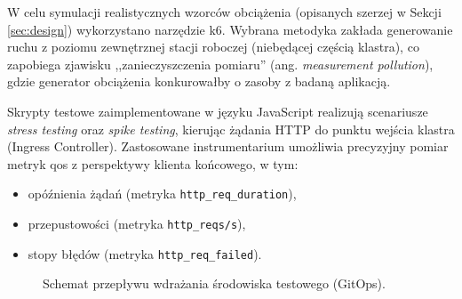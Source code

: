 W celu symulacji realistycznych wzorców obciążenia (opisanych szerzej w Sekcji \ref{sec:design}) wykorzystano narzędzie 
\gls{k6}. Wybrana metodyka zakłada generowanie ruchu z poziomu zewnętrznej stacji roboczej (niebędącej częścią klastra), 
co zapobiega zjawisku ,,zanieczyszczenia pomiaru'' (ang. \textit{measurement pollution}), gdzie generator obciążenia 
konkurowałby o zasoby z badaną aplikacją.

Skrypty testowe zaimplementowane w języku JavaScript realizują scenariusze \textit{stress testing} oraz 
\textit{spike testing}, kierując żądania HTTP do punktu wejścia klastra (Ingress Controller).
Zastosowane instrumentarium umożliwia precyzyjny pomiar metryk \gls{qos} z perspektywy klienta końcowego, w tym:
\begin{itemize}
    \item opóźnienia żądań (metryka \texttt{http\_req\_duration}),
    \item przepustowości (metryka \texttt{http\_reqs/s}),
    \item stopy błędów (metryka \texttt{http\_req\_failed}).
\end{itemize}

\begin{figure}[ht]
    \centering
    \resizebox{\textwidth}{!}{ %
        
    }
    \caption{Schemat przepływu wdrażania środowiska testowego (GitOps).}
    \label{fig:deployment_pipeline}
\end{figure}

%         



